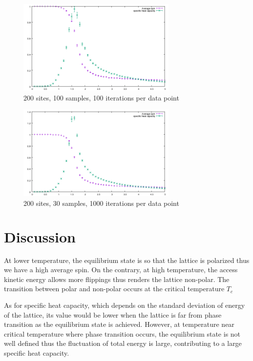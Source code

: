 \documentclass{article}
\begin{document}
\begin{figure}[H]
  \centering
  \includegraphics[width = 0.7\textwidth]{figures/200_sites_100_iterations_100_samples.png}
  \caption{200 sites, 100 samples, 100 iterations per data point}
  \label{fig:10_100_100}
\end{figure}


\begin{figure}[H]
  \centering
  \includegraphics[width = 0.7\textwidth]{figures/200_sites_1000_iterations_30_samples.png}
  \caption{200 sites, 30 samples, 1000 iterations per data point}
  \label{fig:10_30_1000}
\end{figure}


\section{Discussion}
\label{sec-4}

At lower temperature, the equilibrium state is so that the lattice
is polarized thus we have a high average spin. On the contrary, at
high temperature, the access kinetic energy allows more flippings
thus renders the lattice non-polar. The transition between polar and
non-polar occurs at the critical temperature $T_c$

As for specific heat capacity, which depends on the standard
deviation of energy of the lattice, its value would be lower when
the lattice is far from phase transition as the equilibrium state is
achieved. However, at temperature near critical temperature where
phase transition occurs, the equilibrium state is not well defined
thus the fluctuation of total energy is large, contributing to a
large specific heat capacity.
\end{document}
